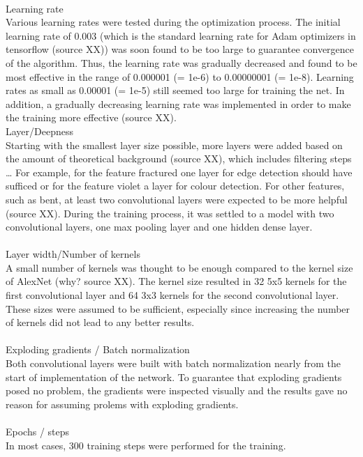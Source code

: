  \\
Learning rate \\
Various learning rates were tested during the optimization process. The initial learning rate of 0.003 (which is the standard learning rate for Adam optimizers in tensorflow (source XX)) was soon found to be too large to guarantee convergence of the algorithm. Thus, the learning rate was gradually decreased and found to be most effective in the range of 0.000001 (= 1e-6) to 0.00000001 (= 1e-8). Learning rates as small as 0.00001 (= 1e-5) still seemed too large for training the net. In addition, a gradually decreasing learning rate was implemented in order to make the training more effective (source XX).
 \\
Layer/Deepness \\
Starting with the smallest layer size possible, more layers were added based on the amount of theoretical background (source XX), which includes filtering steps … For example, for the feature fractured one layer for edge detection should have sufficed or for the feature violet a layer for colour detection. For other features, such as bent, at least two convolutional layers were expected to be more helpful (source XX). During the training process, it was settled to a model with two convolutional layers, one max pooling layer and one hidden dense layer. \\
 \\
Layer width/Number of kernels \\
A small number of kernels was thought to be enough compared to the kernel size of AlexNet (why? source XX). The kernel size resulted in 32 5x5 kernels for the first convolutional layer and 64 3x3 kernels for the second convolutional layer. These sizes were assumed to be sufficient, especially since increasing the number of kernels did not lead to any better results. \\
 \\
Exploding gradients /  Batch normalization \\
Both convolutional layers were built with batch normalization nearly from the start of implementation of the network. To guarantee that exploding gradients posed no problem, the gradients were inspected visually and the results gave no reason for assuming prolems with exploding gradients. \\
 \\
Epochs / steps \\
In most cases, 300 training steps were performed for the training. \\
